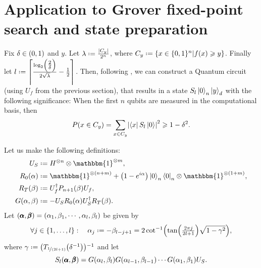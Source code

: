 \documentclass[reqno,oneside,12pt]{amsart}  %
\numberwithin{equation}{section}                %
\let\originalleft\left
\let\originalright\right
\renewcommand{\left}{\mathopen{}\mathclose\bgroup\originalleft}
\renewcommand{\right}{\aftergroup\egroup\originalright}
\def\({\mathopen{}\left(}
\def\){\right)\mathclose{}}
\newcommand*{\eqdef}{\mathrel{\vcenter{\baselineskip0.5ex \lineskiplimit0pt\hbox{.}\hbox{.}}}=}
\def\id{\mathbbm{1}}
\begin{document}
\medskip

\section{Application to Grover fixed-point search and state preparation}

Fix $\delta \in \( 0, 1 \)$ and $y$. Let $\lambda \eqdef \tfrac{\left| C_y \right|}{2^n}$, where $C_y \eqdef \left\{ x \in \{ 0, 1 \}^n \middle| f (x) \geqslant y \right\}$. Finally let $l \eqdef \left\lceil \tfrac{\log_2 \( \tfrac{2}{\delta} \)}{2 \sqrt{\lambda}} - \tfrac{1}{2} \right\rceil$. Then, following \cite{yoder_fixed_2014}, we can construct a Quantum circuit (using $U_f$ from the previous section), that results in a state $S_l \ket{0}_n \ket{y}_d$ with the following significance: When the first $n$ qubits are measured in the computational basis, then
\begin{equation}
   P \( x \in C_y \) = \sum_{x \in C_y} \left| \bra{x} S_l \ket{0} \right|^2 \geqslant 1 - \delta^2.
\end{equation}

Let us make the following definitions:
\begin{align}
   U_S                     &\eqdef H^{\otimes n} \otimes \id^{\otimes m}, \\
   R_0 \( \alpha \)        &\eqdef \id^{\otimes (n + m)} + \( 1 - e^{i \alpha} \) \ket{0}_n \bra{0}_n \otimes \id^{\otimes (1 + m)}, \\
   R_T \( \beta \)         &\eqdef U_f^\dagger P_{n + 1} \( \beta \) U_f, \\
   G \( \alpha, \beta \)   &\eqdef - U_S R_0 \( \alpha \) U_S^\dagger R_T \( \beta \).
\end{align}
Let $\( \pmb{\alpha}, \pmb{\beta} \) = \( \alpha_1, \beta_1, \cdots, \alpha_l, \beta_l \)$ be given by
\begin{equation}
   \forall j \in \{ 1, \ldots, l \}: \quad \alpha_j \eqdef - \beta_{l - j + 1} = 2 \cot^{- 1} \( \tan \( \tfrac{2 \pi j}{2 l + 1} \) \sqrt{1 - \gamma^2} \),
\end{equation}
where $\gamma \eqdef \( T_{\nicefrac{1}{\( 2 l + 1\)}} \( \delta^{- 1} \) \)^{- 1}$
and let
\begin{equation}
   S_l \( \pmb{\alpha}, \pmb{\beta} \) = G \( \alpha_l, \beta_l \) G \( \alpha_{l - 1}, \beta_{l - 1} \) \cdots G \( \alpha_1, \beta_1 \) U_S. \label{eq:S_l-def}
\end{equation}





   
\end{document}
